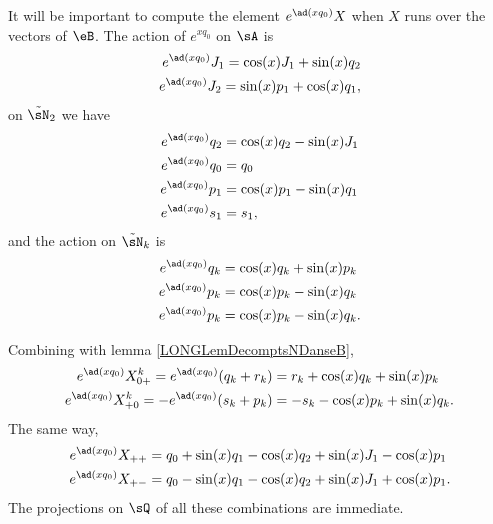 It will be important to compute the element $ e^{\ad(xq_0)}X$ when $X$ runs over the vectors of $\eB$. 
%
The action of $e^{xq_0}$ on $\sA$ is
\begin{subequations}			\label{LONGSubEqsAdxqzJJ}
	\begin{align}
		e^{\ad(xq_0)}J_1=\cos(x)J_1+\sin(x)q_2\\
		e^{\ad(xq_0)}J_2=\sin(x)p_1+\cos(x)q_1,
	\end{align}
\end{subequations}
on $\tilde\sN_2$ we have
\begin{subequations}					\label{LONGSubEqsexpxzqpsdzuu}
	\begin{align}
		e^{\ad(xq_0)}q_2&=\cos(x)q_2-\sin(x)J_1\\
		e^{\ad(xq_0)}q_0&=q_0\\
		e^{\ad(xq_0)}p_1&=\cos(x)p_1-\sin(x)q_1 		\label{LONGEqAdqzpUn}\\
		e^{\ad(xq_0)}s_1&=s_1,
	\end{align}
\end{subequations}
and the action on $\tilde\sN_k$ is
\begin{subequations}		\label{LONGEqExpAdqkpk}
	\begin{align}
		e^{\ad(xq_0)}q_k&=\cos(x)q_k+\sin(x)p_k\\
		e^{\ad(xq_0)}p_k&=\cos(x)p_k-\sin(x)q_k\\
		e^{\ad(xq_0)}p_k&=\cos(x)p_k-\sin(x)q_k.
	\end{align}
\end{subequations}

Combining with lemma \ref{LONGLemDecomptsNDanseB},
\begin{subequations}			\label{LONGEqExpoQzSurNk}
	\begin{align}
		e^{\ad(xq_0)}X_{0+}^k=e^{\ad(xq_0)}(q_k+r_k)&=r_k+\cos(x)q_k+\sin(x)p_k		\label{LONGEqExpoQzSurNka}\\
		e^{\ad(xq_0)}X_{+0}^k=-e^{\ad(xq_0)}(s_k+p_k)&=-s_k-\cos(x)p_k+\sin(x)q_k.\label{LONGEqExpoQzSurNkb}
	\end{align}
\end{subequations}
The same way,
\begin{subequations}			\label{LONGEqExpoQzN}
	\begin{align}
		e^{\ad(xq_0)}X_{++}&=q_0+\sin(x)q_1-\cos(x)q_2+\sin(x)J_1-\cos(x)p_1\\
		e^{\ad(xq_0)}X_{+-}&=q_0-\sin(x)q_1-\cos(x)q_2+\sin(x)J_1+\cos(x)p_1.
	\end{align}
\end{subequations}
The projections on $\sQ$ of all these combinations are immediate.

